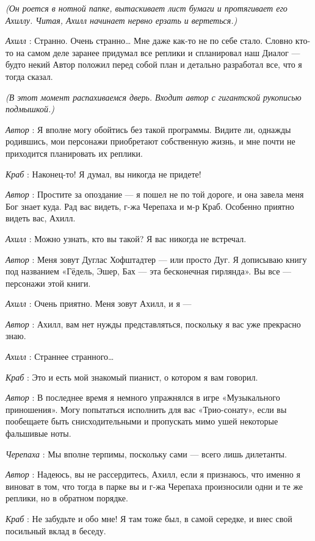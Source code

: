 \documentclass[../main.tex]{subfiles}
\begin{document}
\begin{dialogue}
\emph{(Он роется в нотной папке, вытаскивает лист бумаги и протягивает его Ахиллу. Читая, Ахилл начинает нервно ерзать и вертеться.)}

\emph{Ахилл} : Странно. Очень странно\ldots{} Мне даже как-то не по себе стало. Словно кто-то на самом деле заранее придумал все реплики и спланировал наш Диалог --- будто некий Автор положил перед собой план и детально разработал все, что я тогда сказал.

\emph{(В этот момент распахиваемся дверь. Входит автор с гигантской рукописью подмышкой.)}

\emph{Автор} : Я вполне могу обойтись без такой программы. Видите ли, однажды родившись, мои персонажи приобретают собственную жизнь, и мне почти не приходится планировать их реплики.

\emph{Краб} : Наконец-то! Я думал, вы никогда не придете!

\emph{Автор} : Простите за опоздание --- я пошел не по той дороге, и она завела меня Бог знает куда. Рад вас видеть, г-жа Черепаха и м-р Краб. Особенно приятно видеть вас, Ахилл.

\emph{Ахилл} : Можно узнать, кто вы такой? Я вас никогда не встречал.

\emph{Автор} : Меня зовут Дуглас Хофштадтер --- или просто Дуг. Я дописываю книгу под названием «Гёдель, Эшер, Бах --- эта бесконечная гирлянда». Вы все --- персонажи этой книги.

\emph{Ахилл} : Очень приятно. Меня зовут Ахилл, и я ---

\emph{Автор} : Ахилл, вам нет нужды представляться, поскольку я вас уже прекрасно знаю.

\emph{Ахилл} : Страннее странного\ldots{}

\emph{Краб} : Это и есть мой знакомый пианист, о котором я вам говорил.

\emph{Автор} : В последнее время я немного упражнялся в игре «Музыкального приношения». Могу попытаться исполнить для вас «Трио-сонату», если вы пообещаете быть снисходительными и пропускать мимо ушей некоторые фальшивые ноты.

\emph{Черепаха} : Мы вполне терпимы, поскольку сами --- всего лишь дилетанты.

\emph{Автор} : Надеюсь, вы не рассердитесь, Ахилл, если я признаюсь, что именно я виноват в том, что тогда в парке вы и г-жа Черепаха произносили одни и те же реплики, но в обратном порядке.

\emph{Краб} : Не забудьте и обо мне! Я там тоже был, в самой середке, и внес свой посильный вклад в беседу.


\end{dialogue}
\end{document}
